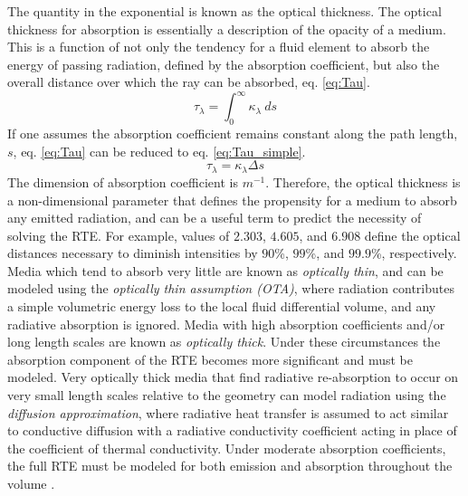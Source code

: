 The quantity in the exponential is known as the optical thickness. The optical thickness for absorption is essentially a description of the opacity of a medium. This is a function of not only the tendency for a fluid element to absorb the energy of passing radiation, defined by the absorption coefficient, but also the overall distance over which the ray can be absorbed, eq. \ref{eq:Tau}.
\begin{equation}
    \tau{}_\lambda = \int^\infty_0{\kappa{}_\lambda{}~ds}
    \label{eq:Tau}
\end{equation}
If one assumes the absorption coefficient remains constant along the path length, $s$, eq. \ref{eq:Tau} can be reduced to eq. \ref{eq:Tau_simple}.
\begin{equation}
    \tau{}_\lambda = \kappa{}_\lambda{}\Delta{s}
    \label{eq:Tau_simple}
\end{equation}
The dimension of absorption coefficient is $m^{-1}$. Therefore, the optical thickness is a non-dimensional parameter that defines the propensity for a medium to absorb any emitted radiation, and can be a useful term to predict the necessity of solving the RTE. 
For example, values of $2.303$, $4.605$, and $6.908$ define the optical distances necessary to diminish intensities by $90$\%, $99$\%, and $99.9$\%, respectively.
Media which tend to absorb very little are known as \textit{optically thin}, and can be modeled using the \textit{optically thin assumption (OTA)}, where radiation contributes a simple volumetric energy loss to the local fluid differential volume, and any radiative absorption is ignored.
Media with high absorption coefficients and/or long length scales are known as \textit{optically thick}. Under these circumstances the absorption component of the RTE becomes more significant and must be modeled.
Very optically thick media that find radiative re-absorption to occur on very small length scales relative to the geometry can model radiation using the \textit{diffusion approximation}, where radiative heat transfer is assumed to act similar to conductive diffusion with a radiative conductivity coefficient acting in place of the coefficient of thermal conductivity. 
Under moderate absorption coefficients, the full RTE must be modeled for both emission and absorption throughout the volume \cite{Modest2013RadiativeTransfer}.

